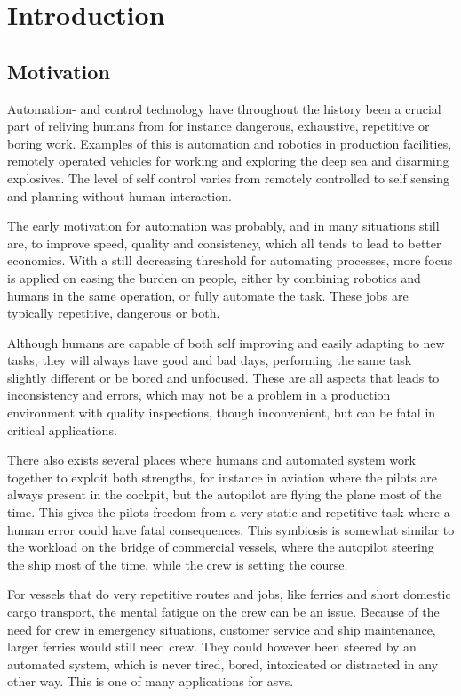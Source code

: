 
\chapter{Introduction}\label{chapter:introduction}
\section{Motivation}\label{sec:motivation}
Automation- and control technology have throughout the history been a crucial part of reliving humans from for instance dangerous, exhaustive, repetitive or boring work. Examples of this is automation and robotics in production facilities, remotely operated vehicles for working and exploring the deep sea and disarming explosives. The level of self control varies from remotely controlled to self sensing and planning without human interaction.

The early motivation for automation was probably, and in many situations still are, to improve speed, quality and consistency, which all tends to lead to better economics. With a still decreasing threshold for automating processes, more focus is applied on easing the burden on people, either by combining robotics and humans in the same operation, or fully automate the task. These jobs are typically repetitive, dangerous or both.

Although humans are capable of both self improving and easily adapting to new tasks, they  will always have good and bad days, performing the same task slightly different or be bored and unfocused. These are all aspects that leads to inconsistency and errors, which may not be a problem in a production environment with quality inspections, though inconvenient, but can be fatal in critical applications. 

There also exists several places where humans and automated system work together to exploit both strengths, for instance in aviation where the pilots are always present in the cockpit, but the autopilot are flying the plane most of the time. This gives the pilots freedom from a very static and repetitive task where a human error could have fatal consequences. This symbiosis is somewhat similar to the workload on the bridge of commercial vessels, where the autopilot steering the ship most of the time, while the crew is setting the course. 

For vessels that do very repetitive routes and jobs, like ferries and short domestic cargo transport, the mental fatigue on the crew can be an issue. Because of the need for crew in emergency situations, customer service and ship maintenance, larger ferries would still need crew. They could however been steered by an automated system, which is never tired, bored, intoxicated or distracted in any other way. This is one of many applications for \glspl{asv}.

